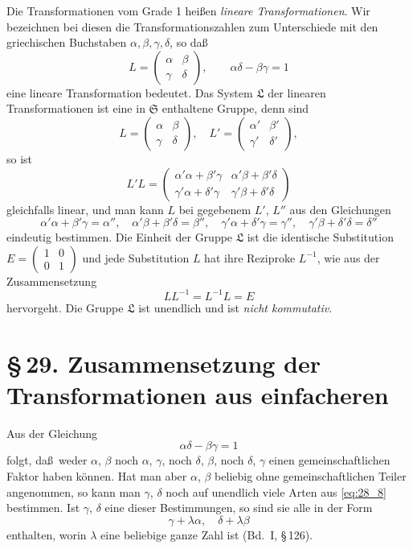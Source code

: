 \documentclass[12pt,a4paper]{article}
\begin{document}
Die Transformationen vom Grade 1 hei\ss en \emph{lineare Transformationen}. Wir bezeichnen bei diesen die Transformationszahlen zum Unterschiede mit den griechischen Buchstaben $\alpha,\beta,\gamma,\delta$, so da\ss
\[
L = \begin{pmatrix} \alpha & \beta \\ \gamma & \delta \end{pmatrix},\qquad \alpha\delta-\beta\gamma=1
\]
eine lineare Transformation bedeutet. Das System $\mathfrak{L}$ der linearen Transformationen ist eine in $\mathfrak{S}$ enthaltene Gruppe, denn sind
\[
L = \begin{pmatrix} \alpha & \beta \\ \gamma & \delta \end{pmatrix},\quad L' = \begin{pmatrix} \alpha' & \beta' \\ \gamma' & \delta' \end{pmatrix},
\]
so ist
\[
L'L = \begin{pmatrix} \alpha'\alpha+\beta'\gamma & \alpha'\beta+\beta'\delta \\ \gamma'\alpha+\delta'\gamma & \gamma'\beta+\delta'\delta \end{pmatrix}
\]
gleichfalls linear, und man kann $L$ bei gegebenem $L'$, $L''$ aus den Gleichungen
\[
\alpha'\alpha+\beta'\gamma=\alpha'',\quad \alpha'\beta+\beta'\delta=\beta'',\quad \gamma'\alpha+\delta'\gamma=\gamma'',\quad \gamma'\beta+\delta'\delta=\delta''
\]
eindeutig bestimmen. Die Einheit der Gruppe $\mathfrak{L}$ ist die identische Substitution $E=\begin{pmatrix}1&0\\0&1\end{pmatrix}$ und jede Substitution $L$ hat ihre Reziproke $L^{-1}$, wie aus der Zusammensetzung
\[
LL^{-1} = L^{-1}L = E
\]
hervorgeht. Die Gruppe $\mathfrak{L}$ ist unendlich und ist \emph{nicht kommutativ}.


\section{\S\,29. Zusammensetzung der Transformationen aus einfacheren}

\newpage

Aus der Gleichung
\[
\alpha\delta-\beta\gamma=1
\]
folgt, da\ss\ weder $\alpha$, $\beta$ noch $\alpha$, $\gamma$, noch $\delta$, $\beta$, noch $\delta$, $\gamma$ einen gemeinschaftlichen Faktor haben k\"onnen. Hat man aber $\alpha$, $\beta$ beliebig ohne gemeinschaftlichen Teiler angenommen, so kann man $\gamma$, $\delta$ noch auf unendlich viele Arten aus \eqref{eq:28_8} bestimmen. Ist $\gamma$, $\delta$ eine dieser Bestimmungen, so sind sie alle in der Form
\begin{equation}\label{eq:29_9}
\gamma+\lambda\alpha,\quad \delta+\lambda\beta
\end{equation}
enthalten, worin $\lambda$ eine beliebige ganze Zahl ist (Bd.~I, \S\,126).
\end{document}
